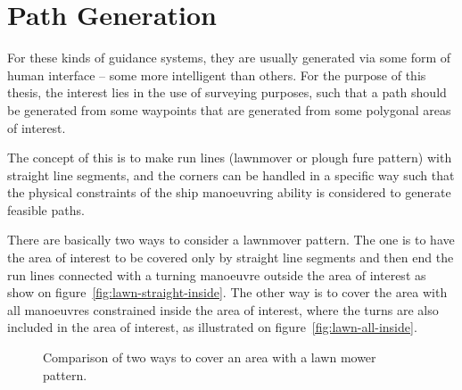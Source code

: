 \chapter{Path Generation}
\label{ch:pathgen}

\noindent For these kinds of guidance systems, they are usually generated via some
form of human interface -- some more intelligent than others. For the
purpose of this thesis, the interest lies in the use of surveying
purposes, such that a path should be generated from some waypoints
that are generated from some polygonal areas of interest.

The concept of this is to make run lines (lawnmover or plough fure pattern) with
straight line segments, and the corners can be handled in a specific
way such that the physical constraints of the ship manoeuvring ability
is considered to generate feasible paths.

There are basically two ways to consider a lawnmover pattern. The
one is to have the area of interest to be covered only by straight line
segments and then end the run lines connected with a turning manoeuvre outside the
area of interest as show on figure~\vref{fig:lawn-straight-inside}. The other way is to cover the area with all manoeuvres constrained inside the area of interest, where the turns are also included in the area of interest, as illustrated on figure~\vref{fig:lawn-all-inside}.

\begin{figure}[htbp]
	\centering
	\qquad
	\caption{Comparison of two ways to cover an area with a lawn mower
	pattern.}
\end{figure}

